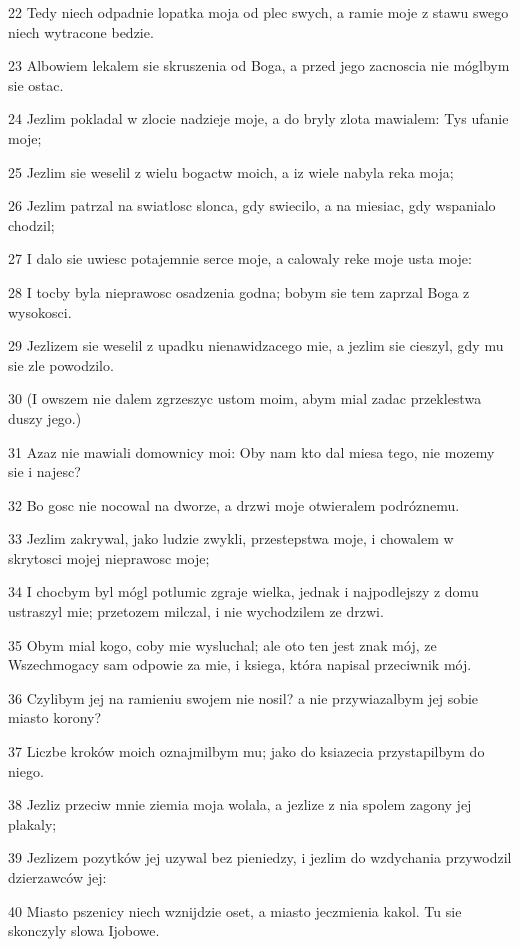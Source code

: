 \par 22 Tedy niech odpadnie lopatka moja od plec swych, a ramie moje z stawu swego niech wytracone bedzie.
\par 23 Albowiem lekalem sie skruszenia od Boga, a przed jego zacnoscia nie móglbym sie ostac.
\par 24 Jezlim pokladal w zlocie nadzieje moje, a do bryly zlota mawialem: Tys ufanie moje;
\par 25 Jezlim sie weselil z wielu bogactw moich, a iz wiele nabyla reka moja;
\par 26 Jezlim patrzal na swiatlosc slonca, gdy swiecilo, a na miesiac, gdy wspanialo chodzil;
\par 27 I dalo sie uwiesc potajemnie serce moje, a calowaly reke moje usta moje:
\par 28 I tocby byla nieprawosc osadzenia godna; bobym sie tem zaprzal Boga z wysokosci.
\par 29 Jezlizem sie weselil z upadku nienawidzacego mie, a jezlim sie cieszyl, gdy mu sie zle powodzilo.
\par 30 (I owszem nie dalem zgrzeszyc ustom moim, abym mial zadac przeklestwa duszy jego.)
\par 31 Azaz nie mawiali domownicy moi: Oby nam kto dal miesa tego, nie mozemy sie i najesc?
\par 32 Bo gosc nie nocowal na dworze, a drzwi moje otwieralem podróznemu.
\par 33 Jezlim zakrywal, jako ludzie zwykli, przestepstwa moje, i chowalem w skrytosci mojej nieprawosc moje;
\par 34 I chocbym byl mógl potlumic zgraje wielka, jednak i najpodlejszy z domu ustraszyl mie; przetozem milczal, i nie wychodzilem ze drzwi.
\par 35 Obym mial kogo, coby mie wysluchal; ale oto ten jest znak mój, ze Wszechmogacy sam odpowie za mie, i ksiega, która napisal przeciwnik mój.
\par 36 Czylibym jej na ramieniu swojem nie nosil? a nie przywiazalbym jej sobie miasto korony?
\par 37 Liczbe kroków moich oznajmilbym mu; jako do ksiazecia przystapilbym do niego.
\par 38 Jezliz przeciw mnie ziemia moja wolala, a jezlize z nia spolem zagony jej plakaly;
\par 39 Jezlizem pozytków jej uzywal bez pieniedzy, i jezlim do wzdychania przywodzil dzierzawców jej:
\par 40 Miasto pszenicy niech wznijdzie oset, a miasto jeczmienia kakol. Tu sie skonczyly slowa Ijobowe.

